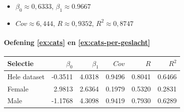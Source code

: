 \begin{itemize}
  \item $\beta_{0} \approx 0,6333$, $\beta_{1} \approx 0.9667$
  \item $Cov \approx 6,444$, $R \approx 0,9352$, $R^2 \approx 0,8747$
\end{itemize}

\paragraph{Oefening \ref{ex:cats} en \ref{ex:cats-per-geslacht}}

\begin{center}
  \begin{tabular}{lrrrrr}
  	\toprule
    \textbf{Selectie} & \textbf{$\beta_{0}$} & \textbf{$\beta_{1}$} & \textbf{$Cov$} & \textbf{$R$} & \textbf{$R^2$} \\
    \midrule
  	Hele dataset & -0.3511 & 4.0318 & 0.9496 & 0.8041 & 0.6466 \\
  	Female       &  2.9813 & 2.6364 & 0.1979 & 0.5320 & 0.2831 \\
  	Male         & -1.1768 & 4.3098 & 0.9419 & 0.7930 & 0.6289 \\
    \bottomrule
  \end{tabular}
\end{center}
